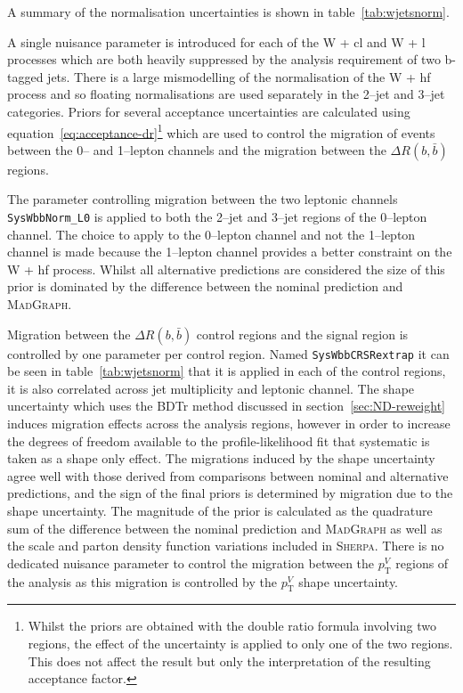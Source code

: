 A summary of the normalisation uncertainties is shown in
table~\ref{tab:wjetsnorm}.

A single nuisance parameter is introduced for each of the W + cl and W + l
processes which are both heavily suppressed by the analysis requirement of two
b-tagged jets. There is a large mismodelling of the normalisation of the W + hf
process and so floating normalisations are used separately in the 2--jet and
3--jet categories. Priors for several acceptance uncertainties are calculated using
equation~\ref{eq:acceptance-dr}\footnote{Whilst the priors are obtained with the
  double ratio formula involving two regions, the effect of the uncertainty is
  applied to only one of the two regions. This does not affect the result but
  only the interpretation of the resulting acceptance factor.} which are used to
control the migration of events between the 0-- and 1--lepton channels and the
migration between the $\Delta R(b, \bar{b})$ regions.

The parameter controlling migration between the two leptonic channels
\texttt{SysWbbNorm\_L0} is applied to both the 2--jet and 3--jet regions of the
0--lepton channel. The choice to apply to the 0--lepton channel and not the
1--lepton channel is made because the 1--lepton channel provides a better
constraint on the W + hf process. Whilst all alternative predictions are
considered the size of this prior is dominated by the difference between the
nominal prediction and \textsc{MadGraph}.

Migration between the $\Delta R(b, \bar{b})$ control regions and the signal
region is controlled by one parameter per control region. Named
\texttt{SysWbbCRSRextrap} it can be seen in table~\ref{tab:wjetsnorm} that it is
applied in each of the control regions, it is also correlated across jet
multiplicity and leptonic channel. The shape uncertainty which uses the BDTr
method discussed in section~\ref{sec:ND-reweight} induces migration effects
across the analysis regions, however in order to increase the degrees of freedom
available to the profile-likelihood fit that systematic is taken as a shape only
effect. The migrations induced by the shape uncertainty agree well with those
derived from comparisons between nominal and alternative predictions, and the
sign of the final priors is determined by migration due to the shape
uncertainty. The magnitude of the prior is calculated as the quadrature sum of
the difference between the nominal prediction and \textsc{MadGraph} as well as
the scale and parton density function variations included in \textsc{Sherpa}.
There is no dedicated nuisance parameter to control the migration between the
$p_{\mathrm{T}}^V$ regions of the analysis as this migration is controlled by the $p_{\mathrm{T}}^V$
shape uncertainty.

